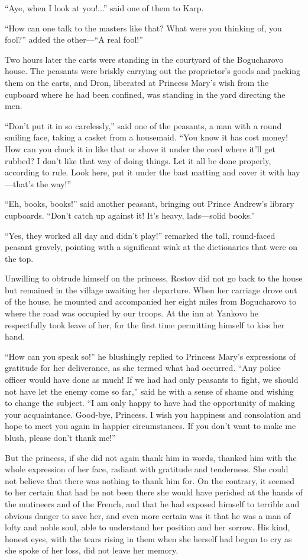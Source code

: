 ``Aye, when I look at you!...'' said one of them to Karp.

``How can one talk to the masters like that? What were you
thinking of, you fool?'' added the other---``A real fool!''

Two hours later the carts were standing in the courtyard of the
Bogucharovo house. The peasants were briskly carrying out the
proprietor's goods and packing them on the carts, and Dron,
liberated at Princess Mary's wish from the cupboard where he had
been confined, was standing in the yard directing the men.

``Don't put it in so carelessly,'' said one of the peasants, a
man with a round smiling face, taking a casket from a
housemaid. ``You know it has cost money! How can you chuck it in
like that or shove it under the cord where it'll get rubbed? I
don't like that way of doing things. Let it all be done properly,
according to rule. Look here, put it under the bast matting and
cover it with hay---that's the way!''

``Eh, books, books!'' said another peasant, bringing out Prince
Andrew's library cupboards. ``Don't catch up against it! It's
heavy, lads---solid books.''

``Yes, they worked all day and didn't play!'' remarked the tall,
round-faced peasant gravely, pointing with a significant wink at
the dictionaries that were on the top.

Unwilling to obtrude himself on the princess, Rostov did not go
back to the house but remained in the village awaiting her
departure. When her carriage drove out of the house, he mounted
and accompanied her eight miles from Bogucharovo to where the
road was occupied by our troops. At the inn at Yankovo he
respectfully took leave of her, for the first time permitting
himself to kiss her hand.

``How can you speak so!'' he blushingly replied to Princess
Mary's expressions of gratitude for her deliverance, as she
termed what had occurred. ``Any police officer would have done as
much! If we had had only peasants to fight, we should not have
let the enemy come so far,'' said he with a sense of shame and
wishing to change the subject. ``I am only happy to have had the
opportunity of making your acquaintance.  Good-bye, Princess. I
wish you happiness and consolation and hope to meet you again in
happier circumstances. If you don't want to make me blush, please
don't thank me!''

But the princess, if she did not again thank him in words,
thanked him with the whole expression of her face, radiant with
gratitude and tenderness. She could not believe that there was
nothing to thank him for. On the contrary, it seemed to her
certain that had he not been there she would have perished at the
hands of the mutineers and of the French, and that he had exposed
himself to terrible and obvious danger to save her, and even more
certain was it that he was a man of lofty and noble soul, able to
understand her position and her sorrow. His kind, honest eyes,
with the tears rising in them when she herself had begun to cry
as she spoke of her loss, did not leave her memory.

